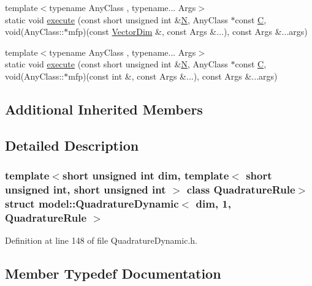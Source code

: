 \begin{DoxyCompactItemize}
\item 
{\footnotesize template$<$typename Any\+Class , typename... Args$>$ }\\static void \hyperlink{structmodel_1_1_quadrature_dynamic_3_01dim_00_011_00_01_quadrature_rule_01_4_a889a989c277896264674a8a1827e5d61}{execute} (const short unsigned int \&\hyperlink{thompson__tetrahedron_8m_a7823765a845eb81829f110d8337f81ae}{N}, Any\+Class $\ast$const \hyperlink{plot_cells_8m_aaa53ca0b650dfd85c4f59fa156f7a2cc}{C}, void(Any\+Class\+::$\ast$mfp)(const \hyperlink{structmodel_1_1_quadrature_dynamic_3_01dim_00_011_00_01_quadrature_rule_01_4_a3efc5051d8d4eeceef8619ddd379ec2f}{Vector\+Dim} \&, const Args \&...), const Args \&...args)
\item 
{\footnotesize template$<$typename Any\+Class , typename... Args$>$ }\\static void \hyperlink{structmodel_1_1_quadrature_dynamic_3_01dim_00_011_00_01_quadrature_rule_01_4_a91854eb914b82435271a9a52b196e623}{execute} (const short unsigned int \&\hyperlink{thompson__tetrahedron_8m_a7823765a845eb81829f110d8337f81ae}{N}, Any\+Class $\ast$const \hyperlink{plot_cells_8m_aaa53ca0b650dfd85c4f59fa156f7a2cc}{C}, void(Any\+Class\+::$\ast$mfp)(const int \&, const Args \&...), const Args \&...args)
\end{DoxyCompactItemize}
\subsection*{Additional Inherited Members}


\subsection{Detailed Description}
\subsubsection*{template$<$short unsigned int dim, template$<$ short unsigned int, short unsigned int $>$ class Quadrature\+Rule$>$struct model\+::\+Quadrature\+Dynamic$<$ dim, 1, Quadrature\+Rule $>$}



Definition at line 148 of file Quadrature\+Dynamic.\+h.



\subsection{Member Typedef Documentation}
\hypertarget{structmodel_1_1_quadrature_dynamic_3_01dim_00_011_00_01_quadrature_rule_01_4_a3efc5051d8d4eeceef8619ddd379ec2f}{}
